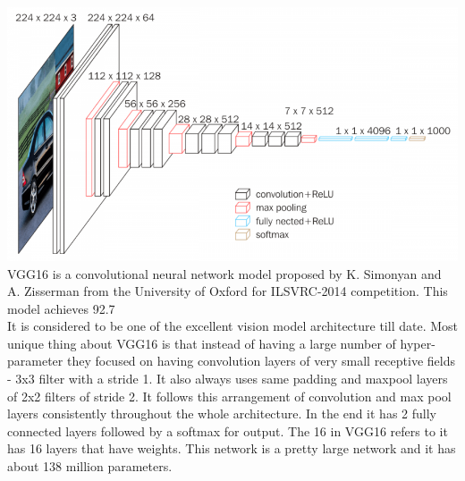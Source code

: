 \includegraphics[scale=0.5]{images/modelOne/vgg16.png}
VGG16 is a convolutional neural network model proposed by K. Simonyan and A. Zisserman from the University of Oxford for ILSVRC-2014 competition. This model achieves 92.7%
\\It is considered to be one of the excellent vision model architecture till date. Most unique thing about VGG16 is that instead of having a large number of hyper-parameter they focused on having convolution layers of very small receptive fields - 3x3 filter with a stride 1. It also always uses same padding and maxpool layers of 2x2 filters of stride 2. It follows this arrangement of convolution and max pool layers consistently throughout the whole architecture. In the end it has 2 fully connected layers followed by a softmax for output. The 16 in VGG16 refers to it has 16 layers that have weights. This network is a pretty large network and it has about 138 million parameters. ~\cite{vgg16desc}
